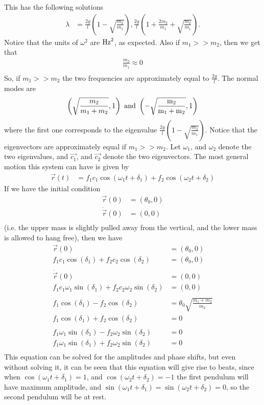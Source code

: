 \documentclass[10pt]{article}
\begin{document}
This has the following solutions
\begin{align*}
  \lambda &= \frac{2 g}{l}\left( 1-\sqrt{\frac{m_2}{m_1}} \right), \frac{2 g}{l}\left( 1+\frac{2m_2}{m_1}+\sqrt{\frac{m_2}{m_1}} \right).
\end{align*}
Notice that the units of $\omega^2$ are $\rm{Hz}^2$, as expected.  Also if 
$m_1>>m_2$, then we get that
\begin{align*}
  \frac{m_2}{m_1} \approx 0\\
\end{align*}
So, if $m_1>>m_2$ the two frequencies are approximately equal to $\frac{2g}{l}$.
The normal modes are
\begin{align*}
  \left( \sqrt{\frac{m_2}{m_1+m_2}},1 \right)\ \rm{and}\ \left( -\sqrt{\frac{m_2}{m_1+m_2}},1 \right)
\end{align*}
where the first one corresponds to the eigenvalue 
$\frac{2 g}{l}\left( 1-\sqrt{\frac{m_2}{m_1}} \right)$.  Notice that the 
eigenvectors are approximately equal if $m_1>>m_2$.  Let $\omega_1$, and 
$\omega_2$ denote the two eigenvalues, and $\vec{c_1}$, and $\vec{c_2}$ denote
the two eigenvectors.  The most general motion this system can have is given by
\begin{align*}
  \vec{r}(t) &= f_1c_1\cos(\omega_1t+\delta_1) + f_2\cos(\omega_2t+\delta_2)
\end{align*}
If we have the initial condition
\begin{align*}
  \vec{r}(0) &= (\theta_0, 0)\\
  \dot\vec{r}(0) &= (0, 0)\\
\end{align*}
(i.e. the upper mass is slightly pulled away from the vertical, and the lower
mass is allowed to hang free), then we have
\begin{align*}
  \vec{r}(0) &= (\theta_0, 0)\\
  f_1c_1\cos(\delta_1)+f_2c_2\cos(\delta_2) &= (\theta_0, 0)\\
  \\
  \dot\vec{r}(0) &= (0, 0)\\
  f_1c_1\omega_1\sin(\delta_1)+f_2c_2\omega_2\sin(\delta_2) &= (0, 0)\\
  \\
  f_1\cos(\delta_1)-f_2\cos(\delta_2) &= \theta_0\sqrt{\frac{m_1+m_2}{m_2}}\\
  f_1\cos(\delta_1)+f_2\cos(\delta_2) &= 0\\
  \\
  f_1\omega_1\sin(\delta_1)-f_2\omega_2\sin(\delta_2) &= 0\\
  f_1\omega_1\sin(\delta_1)+f_2\omega_2\sin(\delta_2) &= 0\\
\end{align*}
This equation can be solved for the amplitudes and phase shifts, but even
without solving it, it can be seen that this equation will give rise to beats,
since when $\cos(\omega_1 t + \delta_1)=1$, and $\cos(\omega_2 t + \delta_2)=-1$
the first pendulum will have maximum amplitude, and 
$\sin(\omega_1 t + \delta_1)=\sin(\omega_2 t + \delta_2)=0$, so the second
pendulum will be at rest.\\
\end{document}
